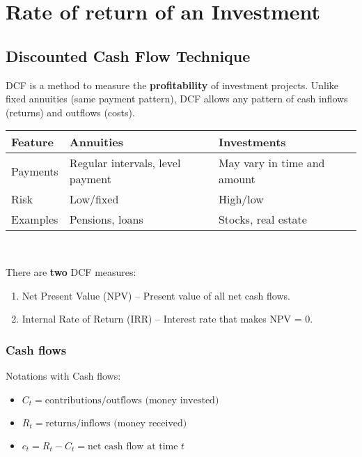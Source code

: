 \chapter{Rate of return of an Investment}

\section{Discounted Cash Flow Technique}

\begin{definition}
    DCF is a method to measure the \textbf{profitability} of investment projects. Unlike fixed annuities (same payment pattern), DCF allows any pattern of cash inflows (returns) and outflows (costs).
\end{definition}

\begin{comments}
\begin{tabular}{|l|l|l|}
\hline
\textbf{Feature} & \textbf{Annuities} & \textbf{Investments} \\
\hline
Payments & Regular intervals, level payment & May vary in time and amount\\
\hline
Risk & Low/fixed & High/low \\
\hline
Examples & Pensions, loans & Stocks, real estate \\
\hline
\end{tabular}
\end{comments}
\\

\begin{comments}
    There are \textbf{two} DCF measures:
\begin{enumerate}  
    \item Net Present Value (NPV) – Present value of all net cash flows. 
    \item Internal Rate of Return (IRR) – Interest rate that makes NPV = 0. 
\end{enumerate}
\end{comments}







\subsection{Cash flows}

\par Notations with Cash flows:
\begin{itemize}[noitemsep] 
    \item $C_t = \text{contributions/outflows (money invested)}$
    \item $R_t = \text{returns/inflows (money received)}$
    \item $c_t = R_t - C_t = \text{net cash flow at time } t $
\end{itemize}

